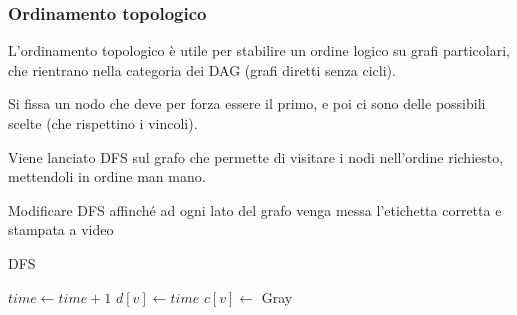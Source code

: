\subsubsection{Ordinamento topologico}
L'ordinamento topologico è utile per stabilire un ordine logico su grafi particolari, che rientrano nella categoria dei DAG (grafi diretti senza cicli). 

Si fissa un nodo che deve per forza essere il primo, e poi ci sono delle possibili scelte (che rispettino i vincoli). 

Viene lanciato DFS sul grafo che permette di visitare i nodi nell'ordine richiesto, mettendoli in ordine man mano.

\begin{example}{}{}
	Modificare DFS affinché ad ogni lato del grafo venga messa l'etichetta corretta e stampata a video

	\begin{algorithm}[H]
		\caption{DFS}
		\begin{algorithmic}
				\State $time \gets time + 1$
				\State $d[v] \gets time$
				\State $c[v] \gets $ Gray
				 
						\State {}
						\State {}
						\State {}
					 
							\State {}
						\Else
							\State {}
						\EndIf
					\EndIf
				\EndFor
			\EndFunction
		\end{algorithmic}
	\end{algorithm}
\end{example}